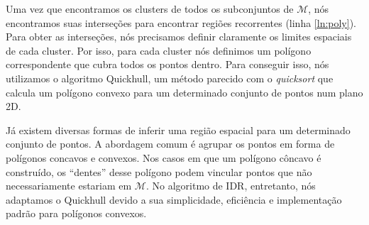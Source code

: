 Uma vez que encontramos os clusters de todos os subconjuntos de $\mathcal{M}$, nós encontramos suas interseções para encontrar regiões recorrentes (linha \ref{ln:poly}). Para obter as interseções, nós precisamos definir claramente os limites espaciais de cada cluster. Por isso, para cada cluster nós definimos um polígono correspondente que cubra todos os pontos dentro. Para conseguir isso, nós utilizamos o algoritmo Quickhull, um método parecido com o \textit{quicksort} que calcula um polígono convexo para um determinado conjunto de pontos num plano 2D.

Já existem diversas formas de inferir uma região espacial para um determinado conjunto de pontos. A abordagem comum é agrupar os pontos em forma de polígonos concavos e convexos. Nos casos em que um polígono côncavo é construído, os ``dentes'' desse polígono podem vincular pontos que não necessariamente estariam em $\mathcal{M}$. No algoritmo de IDR, entretanto, nós adaptamos o Quickhull devido a sua simplicidade, eficiência e implementação padrão para polígonos convexos.